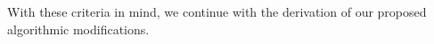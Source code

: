 \documentclass[superscriptaddress,showkeys, nofootinbib, pre, aps]{revtex4-1}
\begin{document}
With these criteria in mind, we continue with the derivation of our proposed algorithmic modifications.

\end{document}
